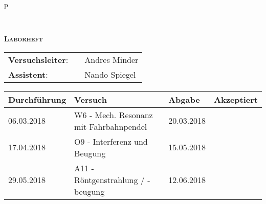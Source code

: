 \begin{tabular}{p{\textwidth}}

	\begin{center}
	\end{center}

\\

	\begin{center}
		\Huge{\textsc{\textbf{Laborheft}}}
	\end{center}

\vspace*{2cm}

	\begin{flushleft}
		\begin{tabular}{lll}
			\LARGE \textbf{Versuchsleiter}: & 	\hspace{2cm} & \LARGE Andres Minder\\
			\LARGE \textbf{Assistent}: 		& 	\hspace{2cm} & \LARGE Nando Spiegel\\
		\end{tabular}
	\end{flushleft}

\vspace*{2cm}

	\begin{center}
	\renewcommand{\arraystretch}{4}
	\large
		\begin{tabular}{|l|l|l|l|}
			\hline 
			\textbf{Durchführung} & \textbf{Versuch} & \textbf{Abgabe} & \textbf{Akzeptiert} \\ 
			\hline 
			06.03.2018 & W6 - Mech. Resonanz mit Fahrbahnpendel & 20.03.2018 &  \\ 
			\hline 
			17.04.2018 & O9 - Interferenz und Beugung 			& 15.05.2018 &  \\ 
			\hline 
			29.05.2018 & A11 - Röntgenstrahlung / -beugung 		& 12.06.2018 &  \\ 
			\hline 
		\end{tabular}
	\end{center}
		 

\end{tabular}